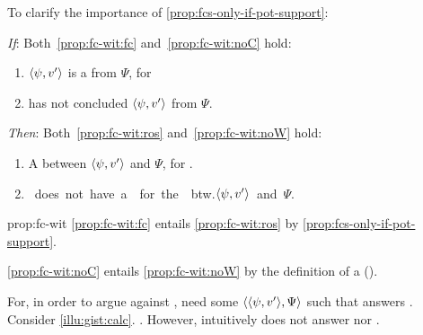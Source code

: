 \begin{note}
  To clarify the importance of \autoref{prop:fcs-only-if-pot-support}:

  \begin{proposition}
    \label{prop:fc-wit}
    \begin{itenum}
    \item[\emph{If}:]
      Both~\ref{prop:fc-wit:fc} and~\ref{prop:fc-wit:noC} hold:
      \begin{enumerate}[label=\alph*., ref=(\alph*)]
      \item
        \label{prop:fc-wit:fc}
        \(\langle \psi, v' \rangle\) is a  from \(\Psi\), for \vAgent{}
      \item
        \label{prop:fc-wit:noC}
        \vAgent{} has not concluded \(\langle \psi, v' \rangle\) from \(\Psi\).
      \end{enumerate}
    \item[\emph{Then}:]
      Both~\ref{prop:fc-wit:ros} and~\ref{prop:fc-wit:noW} hold:
      \begin{enumerate}[label=\alph*\('\)., ref=(\alph*\('\))]
      \item
        \label{prop:fc-wit:ros}
        A \ros{} between \(\langle \psi, v' \rangle\) and \(\Psi\), for \vAgent{}.
      \item
        \label{prop:fc-wit:noW}
        \vAgent{}~does~not~have~a~\wit{}~for~the~\ros{}~btw.\~\(\langle \psi, v' \rangle\)~and~\(\Psi\).
      \end{enumerate}
    \end{itenum}
    \vspace{-\baselineskip}
  \end{proposition}

  \begin{argument}{prop:fc-wit}
    \ref{prop:fc-wit:fc} entails \ref{prop:fc-wit:ros} by \autoref{prop:fcs-only-if-pot-support}.

    \noindent \ref{prop:fc-wit:noC} entails \ref{prop:fc-wit:noW} by the definition of a \wit{} (\witpage{}).
  \end{argument}

  For, in order to argue against \issueConstraint{}, need some \(\langle \langle \psi, v' \rangle, \Psi \rangle\) such that answers \qWhyV{}.
  Consider \autoref{illu:gist:calc}.
  \fc{}.
  However, intuitively does not answer \qWhy{} nor \qWhyV{}.
\end{note}


